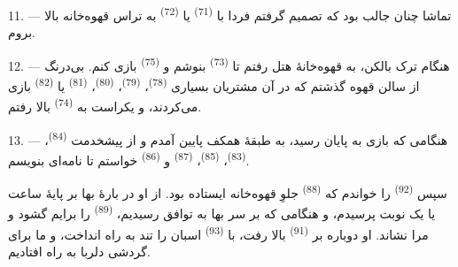 \VUsaut{3.0mm}
\VUsaut{3.0mm}

11. --- تماشا چنان جالب بود که تصمیم گرفتم فردا با 
\textsuperscript{(71)} یا  \textsuperscript{(72)} به
تراس قهوه‌خانه بالا بروم.

12. --- هنگام ترک بالکن، به قهوه‌خانهٔ هتل رفتم تا 
\textsuperscript{(73)} بنوشم و  \textsuperscript{(75)}
بازی کنم. بی‌درنگ از سالن قهوه گذشتم که در آن مشتریان بسیاری
 \textsuperscript{(78)}، 
\textsuperscript{(79)}،  \textsuperscript{(80)}،
 \textsuperscript{(81)} یا 
\textsuperscript{(82)} بازی می‌کردند، و یکراست به  \textsuperscript{(74)} بالا رفتم.

13. --- هنگامی که بازی به پایان رسید، به طبقهٔ همکف پایین آمدم و از
پیشخدمت  \textsuperscript{(84)}، 
\textsuperscript{(83)}،  \textsuperscript{(85)}،
 \textsuperscript{(87)} و 
\textsuperscript{(86)} خواستم تا نامه‌ای بنویسم.

سپس  \textsuperscript{(92)} را خواندم که
 \textsuperscript{(88)} جلوِ قهوه‌خانه ایستاده بود. از
او در بارهٔ بها بر پایهٔ ساعت یا یک نوبت پرسیدم، و هنگامی که بر سر
بها به توافق رسیدیم،  \textsuperscript{(89)} را
برایم گشود و مرا نشاند. او دوباره بر 
\textsuperscript{(91)} بالا رفت، با 
\textsuperscript{(93)} اسبان را تند به راه انداخت، و ما برای گردشی
دلربا به راه افتادیم.

\VUsaut{6.0mm}
\VUfilet{22mm}
